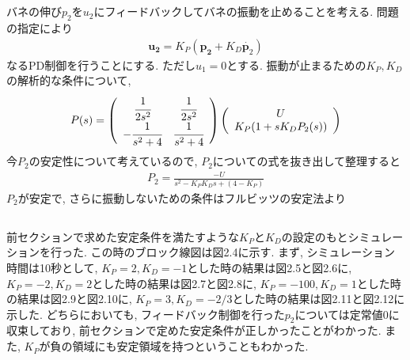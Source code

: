 \documentclass[12pt]{jsarticle}   	%
\begin{document}
\subsection{}
\noindent
バネの伸び$p_2$を$u_2$にフィードバックしてバネの振動を止めることを考える. 問題の指定により
\begin{eqnarray}
\bm{u_2} = K_{P} (\bm{p_2} + K_{D} \dot{\bm{p}_2})
\end{eqnarray}
なるPD制御を行うことにする. ただし$u_1 = 0$とする. 振動が止まるための$K_P, K_D$の解析的な条件について, 
\begin{eqnarray}
P(s) = \left(
    \begin{array}{cc}
      \cfrac{1}{2s^2} & \cfrac{1}{2s^2} \\
      -\cfrac{1}{s^2 + 4} & \cfrac{1}{s^2 + 4} 
    \end{array}
  \right)\left(
   \begin{array}{c}
      U \\
      K_{P} (1 + sK_{D} P_2 (s))
    \end{array}
  \right)
\end{eqnarray}
今$P_2$の安定性について考えているので, $P_2$についての式を抜き出して整理すると
\begin{eqnarray}
P_2 = \frac{-U}{s^2 - K_{P} K_{D} s + (4 - K_{P})}
\end{eqnarray}
$P_2$が安定で, さらに振動しないための条件はフルビッツの安定法より


\subsection{}
\noindent
前セクションで求めた安定条件を満たすような$K_P$と$K_D$の設定のもとシミュレーションを行った. この時のブロック線図は図2.4に示す. まず, シミュレーション時間は10秒として, $K_P = 2, K_D = -1$とした時の結果は図2.5と図2.6に, $K_P = -2, K_D = 2$とした時の結果は図2.7と図2.8に, $K_P = -100, K_D = 1$とした時の結果は図2.9と図2.10に, $K_P = 3, K_D = -2/3$とした時の結果は図2.11と図2.12に示した. どちらにおいても, フィードバック制御を行った$p_2$については定常値0に収束しており, 前セクションで定めた安定条件が正しかったことがわかった. また, $K_P$が負の領域にも安定領域を持つということもわかった.
\end{document}
